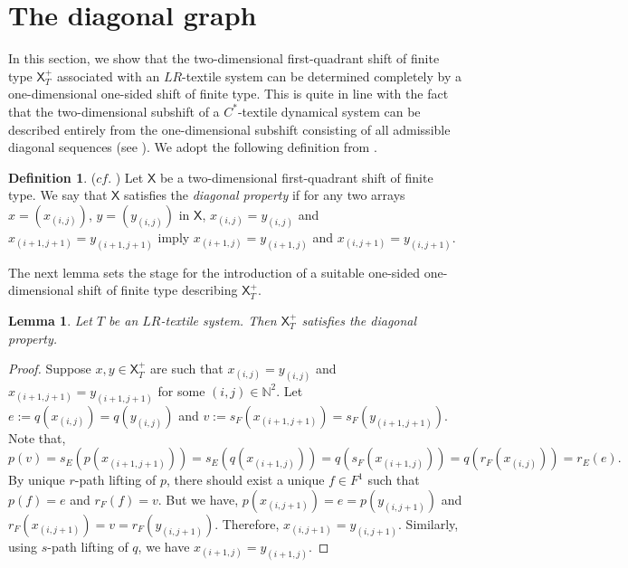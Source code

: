 \documentclass[a4paper,reqno,12pt]{amsart}
\newtheorem{lem}[thm]{Lemma}
\theoremstyle{definition}
\newtheorem{dfn}[thm]{Definition}
\theoremstyle{remark}
\begin{document}
\section{The diagonal graph}\label{sec the diagonal graph}
In this section, we show that the two-dimensional first-quadrant shift of finite type $\mathsf{X}_T^+$ associated with an $LR$-textile system can be determined completely by a one-dimensional one-sided shift of finite type. This is quite in line with the fact that the two-dimensional subshift of a $C^*$-textile dynamical system can be described entirely from the one-dimensional subshift consisting of all admissible diagonal sequences (see \cite[\S 3]{Matsumoto}).  We adopt the following definition from \cite{Matsumoto}. 

\begin{dfn}\label{def diagonal property}
($cf.$ \cite[Definition 3.1]{Matsumoto}) Let $\mathsf{X}$ be a two-dimensional first-quadrant shift of finite type. We say that $\mathsf{X}$ satisfies the \emph{diagonal property} if for any two arrays $x=(x_{(i,j)})$, $y=(y_{(i,j)})$ in $\mathsf{X}$, $x_{(i,j)}=y_{(i,j)}$ and $x_{(i+1,j+1)}=y_{(i+1,j+1)}$ imply $x_{(i+1,j)}=y_{(i+1,j)}$ and $x_{(i,j+1)}=y_{(i,j+1)}$. 
\end{dfn}

The next lemma sets the stage for the introduction of a suitable one-sided one-dimensional shift of finite type describing $\mathsf{X}_T^+$.
\begin{lem}\label{lem LR textile has the diagonal property}
Let $T$ be an $LR$-textile system. Then $\mathsf{X}_T^+$ satisfies the diagonal property.  
\end{lem}
\begin{proof}
Suppose $x,y\in \mathsf{X}_T^+$ are such that $x_{(i,j)}=y_{(i,j)}$ and $x_{(i+1,j+1)}=y_{(i+1,j+1)}$ for some $(i,j)\in \mathbb{N}^2$. Let $e:=q(x_{(i,j)})=q(y_{(i,j)})$ and $v:=s_F(x_{(i+1,j+1)})=s_F(y_{(i+1,j+1)})$. Note that, \[p(v)=s_E(p(x_{(i+1,j+1)}))=s_E(q(x_{(i+1,j)}))=q(s_F(x_{(i+1,j)}))=q(r_F(x_{(i,j)}))=r_E(e).\] By unique $r$-path lifting of $p$, there should exist a unique $f\in F^1$ such that $p(f)=e$ and $r_F(f)=v$. But we have, $p(x_{(i,j+1)})=e=p(y_{(i,j+1)})$ and $r_F(x_{(i,j+1)})=v=r_F(y_{(i,j+1)})$. Therefore, $x_{(i,j+1)}=y_{(i,j+1)}$. Similarly, using $s$-path lifting of $q$, we have $x_{(i+1,j)}=y_{(i+1,j)}$. 
\end{proof}
\end{document}
